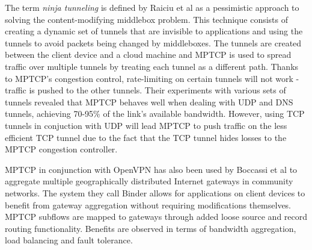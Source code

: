 
The term \textit{ninja tunneling} is defined by Raiciu et al \cite{goodcop} as a pessimistic approach to solving the content-modifying middlebox problem. This technique consists of creating a dynamic set of tunnels that are invisible to applications and using the tunnels to avoid packets being changed by middleboxes. The tunnels are created between the client device and a cloud machine and MPTCP is used to spread traffic over multiple tunnels by treating each tunnel as a different path. Thanks to MPTCP's congestion control, rate-limiting on certain tunnels will not work - traffic is pushed to the other tunnels. Their experiments with various sets of tunnels revealed that MPTCP behaves well when dealing with UDP and DNS tunnels, achieving 70-95\% of the link's available bandwidth. However, using TCP tunnels in conjuction with UDP will lead MPTCP to push traffic on the less efficient TCP tunnel due to the fact that the TCP tunnel hides losses to the MPTCP congestion controller.

MPTCP in conjunction with OpenVPN has also been used by Boccassi et al \cite{binder} to aggregate multiple geographically distributed Internet gateways in community networks. The system they call Binder allows for applications on client devices to benefit from gateway aggregation without requiring modifications themselves. MPTCP subflows are mapped to gateways through added loose source and record routing functionality. Benefits are observed in terms of bandwidth aggregation, load balancing and fault tolerance.

